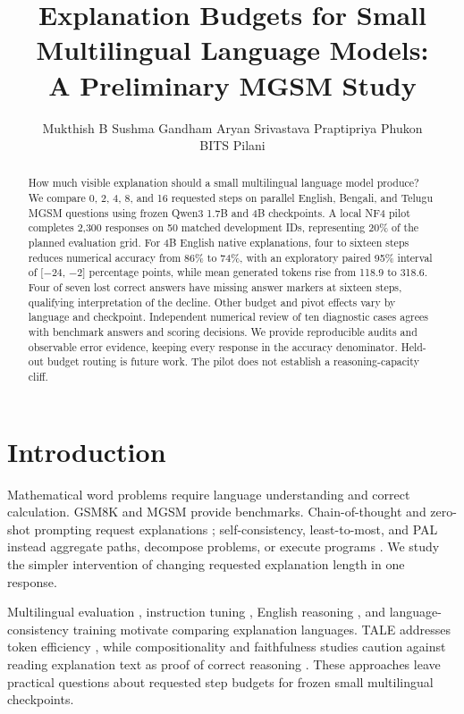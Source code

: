 \documentclass[11pt]{article}
\title{Explanation Budgets for Small Multilingual Language Models:\\A Preliminary MGSM Study}
\author{Mukthish B \quad Sushma Gandham \quad Aryan Srivastava \quad Praptipriya Phukon \\ BITS Pilani}
\begin{document}
\maketitle

\begin{abstract}
How much visible explanation should a small multilingual language model produce? We compare 0, 2, 4, 8, and 16 requested steps on parallel English, Bengali, and Telugu MGSM questions using frozen Qwen3 1.7B and 4B checkpoints. A local NF4 pilot completes 2,300 responses on 50 matched development IDs, representing 20\% of the planned evaluation grid. For 4B English native explanations, four to sixteen steps reduces numerical accuracy from 86\% to 74\%, with an exploratory paired 95\% interval of [$-24$, $-2$] percentage points, while mean generated tokens rise from 118.9 to 318.6. Four of seven lost correct answers have missing answer markers at sixteen steps, qualifying interpretation of the decline. Other budget and pivot effects vary by language and checkpoint. Independent numerical review of ten diagnostic cases agrees with benchmark answers and scoring decisions. We provide reproducible audits and observable error evidence, keeping every response in the accuracy denominator. Held-out budget routing is future work. The pilot does not establish a reasoning-capacity cliff.
\end{abstract}

\section{Introduction}
Mathematical word problems require language understanding and correct calculation. GSM8K \citep{cobbe2021gsm8k} and MGSM \citep{shi2023mgsm} provide benchmarks. Chain-of-thought and zero-shot prompting request explanations \citep{wei2022cot,kojima2022zeroshot}; self-consistency, least-to-most, and PAL instead aggregate paths, decompose problems, or execute programs \citep{wang2023selfconsistency,zhou2023leasttomost,gao2023pal}. We study the simpler intervention of changing requested explanation length in one response.

Multilingual evaluation \citep{hu2020xtreme}, instruction tuning \citep{mcot2024}, English reasoning \citep{linguafranca2026}, and language-consistency training \citep{lang2026} motivate comparing explanation languages. TALE addresses token efficiency \citep{han2025tale}, while compositionality and faithfulness studies caution against reading explanation text as proof of correct reasoning \citep{press2023compositionality,turpin2023faithfulness}. These approaches leave practical questions about requested step budgets for frozen small multilingual checkpoints.
\end{document}
